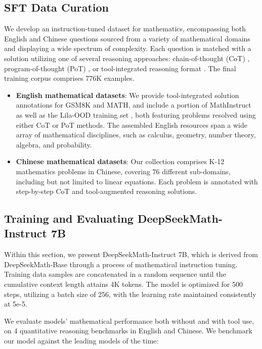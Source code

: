 \begin{itemize}[topsep=0pt]
\subsection{SFT Data Curation}

We develop an instruction-tuned dataset for mathematics, encompassing both English and Chinese questions sourced from a variety of mathematical domains and displaying a wide spectrum of complexity. Each question is matched with a solution utilizing one of several reasoning approaches: chain-of-thought (CoT) \citep{cot}, program-of-thought (PoT) \citep{pot,pal}, or tool-integrated reasoning format \citep{tora}. The final training corpus comprises 776K examples.

\begin{itemize}[topsep=0pt]
    \item \textbf{English mathematical datasets}: We provide tool-integrated solution annotations for GSM8K and MATH, and include a portion of MathInstruct \citep{MathInstruct} as well as the Lila-OOD training set \citep{lila}, both featuring problems resolved using either CoT or PoT methods. The assembled English resources span a wide array of mathematical disciplines, such as calculus, geometry, number theory, algebra, and probability.
    \item \textbf{Chinese mathematical datasets}: Our collection comprises K-12 mathematics problems in Chinese, covering 76 different sub-domains, including but not limited to linear equations. Each problem is annotated with step-by-step CoT and tool-augmented reasoning solutions.
\end{itemize}

\subsection{Training and Evaluating DeepSeekMath-Instruct 7B}

Within this section, we present DeepSeekMath-Instruct 7B, which is derived from DeepSeekMath-Base through a process of mathematical instruction tuning. Training data samples are concatenated in a random sequence until the cumulative context length attains 4K tokens. The model is optimized for 500 steps, utilizing a batch size of 256, with the learning rate maintained consistently at 5e-5.

We evaluate models' mathematical performance both without and with tool use, on 4 quantitative reasoning benchmarks in English and Chinese. We benchmark our model against the leading models of the time:


\end{itemize}
